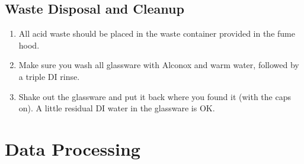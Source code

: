 \documentclass[]{tufte-book}
\providecommand{\tightlist}{%
  \setlength{\itemsep}{0pt}\setlength{\parskip}{0pt}}
\begin{document}
\hypertarget{waste-disposal-and-cleanup}{%
\subsection{Waste Disposal and Cleanup}\label{waste-disposal-and-cleanup}}

\begin{enumerate}
\def\labelenumi{\arabic{enumi}.}
\tightlist
\item
  All acid waste should be placed in the waste container provided in the fume hood.
\item
  Make sure you wash all glassware with Alconox and warm water, followed by a triple DI rinse.
\item
  Shake out the glassware and put it back where you found it (with the caps on). A little residual DI water in the glassware is OK.
\end{enumerate}

\hypertarget{uv-vis-data}{%
\section{Data Processing}\label{uv-vis-data}}
\end{document}
